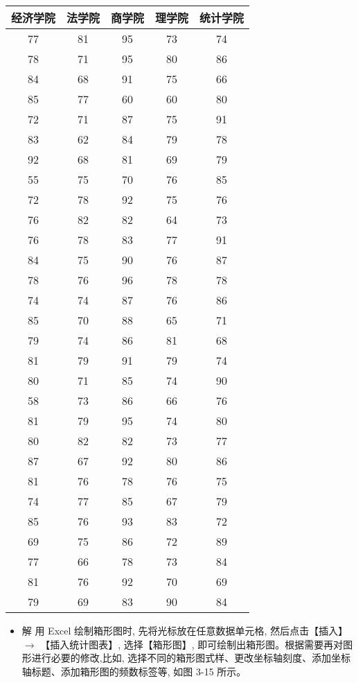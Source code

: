 \documentclass[10pt]{article}
\begin{document}
\begin{CJK*}{UTF8}{bsmi}
\begin{center}
\begin{tabular}{|c|c|c|c|c|}
\hline
经济学院 & 法学院 & 商学院 & 理学院 & 统计学院 \\
\hline
77 & 81 & 95 & 73 & 74 \\
\hline
78 & 71 & 95 & 80 & 86 \\
\hline
84 & 68 & 91 & 75 & 66 \\
\hline
85 & 77 & 60 & 60 & 80 \\
\hline
72 & 71 & 87 & 75 & 91 \\
\hline
83 & 62 & 84 & 79 & 78 \\
\hline
92 & 68 & 81 & 69 & 79 \\
\hline
55 & 75 & 70 & 76 & 85 \\
\hline
72 & 78 & 92 & 75 & 76 \\
\hline
76 & 82 & 82 & 64 & 73 \\
\hline
76 & 78 & 83 & 77 & 91 \\
\hline
84 & 75 & 90 & 76 & 87 \\
\hline
78 & 76 & 96 & 78 & 78 \\
\hline
74 & 74 & 87 & 76 & 86 \\
\hline
85 & 70 & 88 & 65 & 71 \\
\hline
79 & 74 & 86 & 81 & 68 \\
\hline
81 & 79 & 91 & 79 & 74 \\
\hline
80 & 71 & 85 & 74 & 90 \\
\hline
58 & 73 & 86 & 66 & 76 \\
\hline
81 & 79 & 95 & 74 & 80 \\
\hline
80 & 82 & 82 & 73 & 77 \\
\hline
87 & 67 & 92 & 80 & 86 \\
\hline
81 & 76 & 78 & 76 & 75 \\
\hline
74 & 77 & 85 & 67 & 79 \\
\hline
85 & 76 & 93 & 83 & 72 \\
\hline
69 & 75 & 86 & 72 & 89 \\
\hline
77 & 66 & 78 & 73 & 84 \\
\hline
81 & 76 & 92 & 70 & 69 \\
\hline
79 & 69 & 83 & 90 & 84 \\
\hline
\end{tabular}
\end{center}

\begin{itemize}
  \item 解 用 Excel 绘制箱形图时, 先将光标放在任意数据单元格, 然后点击【插入】 $\rightarrow$ 【插入统计图表】, 选择【箱形图】, 即可绘制出箱形图。根据需要再对图形进行必要的修改,比如, 选择不同的箱形图式样、更改坐标轴刻度、添加坐标轴标题、添加箱形图的频数标签等, 如图 3-15 所示。
\end{itemize}


\end{CJK*}
\end{document}
